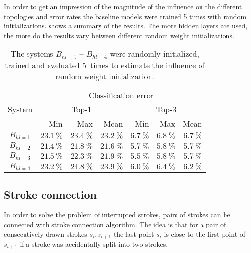 In order to get an impression of the magnitude of the influence on the different
topologies and error rates the baseline models were trained 5 times with
random initializations.
shows a summary of the results. The more hidden layers are used, the more do
the results vary between different random weight initializations.

\begin{table}[h]
    \centering
    \begin{tabular}{crrr|rrr} %
    \toprule
    \multirow{3}{*}{System}  & \multicolumn{6}{c}{Classification error}\\
    \cmidrule(l){2-7}
               & \multicolumn{3}{c}{Top-1}   & \multicolumn{3}{c}{Top-3}\\
               & Min                   & Max                   & Mean                  & Min                  & Max                  & Mean\\\midrule
    $B_{hl=1}$ & $\SI{23.1}{\percent}$ & $\SI{23.4}{\percent}$ & $\SI{23.2}{\percent}$ & $\SI{6.7}{\percent}$ & $\SI{6.8}{\percent}$ & $\SI{6.7}{\percent}$ \\
    $B_{hl=2}$ & \underline{$\SI{21.4}{\percent}$} & \underline{$\SI{21.8}{\percent}$}& \underline{$\SI{21.6}{\percent}$} & $\SI{5.7}{\percent}$ & \underline{$\SI{5.8}{\percent}$} & \underline{$\SI{5.7}{\percent}$}\\
    $B_{hl=3}$ & $\SI{21.5}{\percent}$ & $\SI{22.3}{\percent}$ & $\SI{21.9}{\percent}$ & \underline{$\SI{5.5}{\percent}$} & $\SI{5.8}{\percent}$ & \underline{$\SI{5.7}{\percent}$}\\
    $B_{hl=4}$ & $\SI{23.2}{\percent}$ & $\SI{24.8}{\percent}$ & $\SI{23.9}{\percent}$ & $\SI{6.0}{\percent}$ & $\SI{6.4}{\percent}$ & $\SI{6.2}{\percent}$\\
    \bottomrule
    \end{tabular}
    \caption{The systems $B_{hl=1}$ -- $B_{hl=4}$ were randomly initialized,
             trained and evaluated 5~times to estimate the influence of random
             weight initialization.}
\label{table:baseline-systems-random-initializations-summary}
\end{table}


\subsection{Stroke connection}
In order to solve the problem of interrupted strokes, pairs of strokes
can be connected with stroke connection algorithm. The idea is that for
a pair of consecutively drawn strokes $s_{i}, s_{i+1}$ the last point $s_i$ is
close to the first point of $s_{i+1}$ if a stroke was accidentally split
into two strokes.

